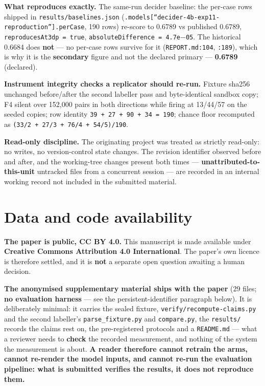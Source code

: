 \documentclass[10pt]{article}
\begin{document}
\textbf{What reproduces exactly.} The same-run decider baseline: the per-case rows shipped in \texttt{results/baselines.json} (\texttt{.models[``decider-4b-exp11-reproduction''].perCase}, 190 rows) re-score to 0.6789 vs published 0.6789, \texttt{reproducesAt3dp = true}, \texttt{absoluteDifference = 4.7e$-$05}. The historical 0.6684 does \textbf{not} --- no per-case rows survive for it (\texttt{REPORT.md:104}, \texttt{:189}), which is why it is the \textbf{secondary} figure and not the declared primary --- \textbf{0.6789} (declared).

\textbf{Instrument integrity checks a replicator should re-run.} Fixture sha256 unchanged before/after the second labeller pass and byte-identical sandbox copy; F4 silent over 152,000 pairs in both directions while firing at 13/44/57 on the seeded copies; row identity \texttt{39 + 27 + 90 + 34 = 190}; chance floor recomputed as \texttt{(33/2 + 27/3 + 76/4 + 54/5)/190}.

\textbf{Read-only discipline.} The originating project was treated as strictly read-only: no writes, no version-control state changes. The revision identifier observed before and after, and the working-tree changes present both times --- \textbf{unattributed-to-this-unit} untracked files from a concurrent session --- are recorded in an internal working record not included in the submitted material.

\section*{Data and code availability}

\textbf{The paper is public, CC BY 4.0.} This manuscript is made available under \textbf{Creative Commons Attribution 4.0 International}. The paper's own licence is therefore settled, and it is \textbf{not} a separate open question awaiting a human decision.

\textbf{The anonymised supplementary material ships with the paper} (29 files; \textbf{no evaluation harness} --- see the persistent-identifier paragraph below). It is deliberately minimal: it carries the sealed fixture, \texttt{verify/recompute-claims.py} and the second labeller's \texttt{parse\_fixture.py} and \texttt{compare.py}, the \texttt{results/} records the claims rest on, the pre-registered protocols and a \texttt{README.md} --- what a reviewer needs to \textbf{check} the recorded measurement, and nothing of the system the measurement is about. \textbf{A reader therefore cannot retrain the arms, cannot re-render the model inputs, and cannot re-run the evaluation pipeline: what is submitted verifies the results, it does not reproduce them.}
\end{document}
